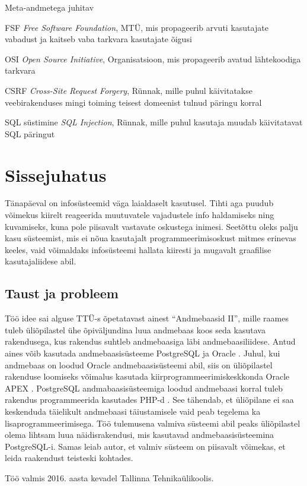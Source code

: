 \documentclass[a4paper,12pt]{article} %
\begin{document}
\begin{labeling}{Meta-andmetega juhitav}
\item [FSF] \textit{Free Software Foundation}, MTÜ, mis propageerib arvuti kasutajate vabadust ja kaitseb vaba tarkvara kasutajate õigusi
\item [OSI] \textit{Open Source Initiative}, Organisatsioon, mis propageerib avatud lähtekoodiga tarkvara
\item [CSRF] \textit{Cross-Site Request Forgery}, Rünnak, mille puhul käivitatakse veebirakenduses mingi toiming teisest domeenist tulnud päringu korral
\item [SQL süstimine] \textit{SQL Injection}, Rünnak, mille puhul kasutaja muudab käivitatavat SQL päringut
\end{labeling}
\pagebreak
\tableofcontents
\newpage
\listoffigures
\pagebreak
\listoftables
\pagebreak
\section{Sissejuhatus}
\label{Sissejuhatus} %
Tänapäeval on infosüsteemid väga laialdaselt kasutusel. Tihti aga puudub võimekus kiirelt reageerida muutuvatele vajadustele info haldamiseks ning kuvamiseks, kuna pole piisavalt vastavate oskustega inimesi. Seetõttu oleks palju kasu süsteemist, mis ei nõua kasutajalt programmeerimisoskust mitmes erinevas keeles, vaid võimaldaks infosüsteemi hallata kiiresti ja mugavalt graafilise kasutajaliidese abil.

\subsection{Taust ja probleem}
Töö idee sai alguse TTÜ-s õpetatavast ainest ``Andmebaasid II'', mille raames tuleb üliõpilastel ühe õpiväljundina luua andmebaas koos seda kasutava rakendusega, kus rakendus suhtleb andmebaasiga läbi andmebaasiliidese. Antud aines võib kasutada andmebaasisüsteeme PostgreSQL \cite{PostgreSQL} ja Oracle \cite{Oracle_DB}. Juhul, kui andmebaas on loodud Oracle andmebaasisüsteemi abil, siis on üliõpilastel rakenduse loomiseks võimalus kasutada kiirprogrammeerimiskeskkonda Oracle APEX \cite{Oracle_APEX}. PostgreSQL andmabaasisüsteemiga loodud andmebaasi korral tuleb rakendus programmeerida kasutades PHP-d \cite{PHP}. See tähendab, et üliõpilane ei saa keskenduda täielikult andmebaasi täiustamisele vaid peab tegelema ka lisaprogrammeerimisega. Töö tulemusena valmiva süsteemi abil peaks üliõpilastel olema lihtsam luua näidisrakendusi, mis kasutavad andmebaasisüsteemina PostgreSQL-i. Samas leiab autor, et valmiv süsteem on piisavalt võimekas, et leida raakendust teisteski kohtades.\par
Töö valmis 2016. aasta kevadel Tallinna Tehnikaülikoolis.
\end{document}
